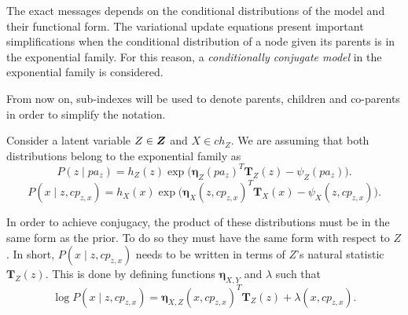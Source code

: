 The exact messages depends on the conditional distributions of the model and their functional form. The variational update equations present important simplifications when the conditional distribution of a node given its parents is in the exponential family. For this reason, a \emph{conditionally conjugate model} in the exponential family is considered.

From now on, sub-indexes will be used to denote parents, children and co-parents in order to simplify the notation.

Consider a latent variable \( Z \in \bm{Z}\) and \( X \in ch_{Z} \). We are assuming that both distributions belong to the exponential family as
\[
  P(z \mid pa_z) = h_Z(z)\exp \Big( {\bm{\eta}_Z(pa_z)}^T\bm{T}_Z(z) - \psi_Z(pa_z) \Big).
\]
\[
  P(x \mid z,cp_{z,x}) = h_X(x)\exp \Big( {\bm{\eta}_X(z, cp_{z,x})}^T\bm{T}_X(x) - \psi_X(z, cp_{z,x}) \Big).
\]

In order to achieve conjugacy, the product of these distributions must be in the same form as the prior. To do so they must have the same form with respect to \( Z \). In short, \(P(x \mid z, cp_{z,x})\) needs to be written in terms of \(Z\)'s natural statistic \( \bm{T}_Z (z)\). This is done by defining functions \( \bm{\eta}_{X,Y} \) and \( \lambda \) such that \begin{equation}\label{eq:vmp_conj}
  \log P(x \mid z , cp_{z,x}) = \bm{\eta}_{X,Z}{(x, cp_{z,x})}^T \bm{T}_Z(z) + \lambda(x, cp_{z,x}).
\end{equation}

